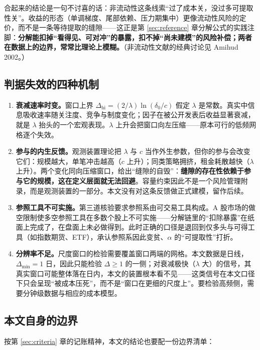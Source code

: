 合起来的结论是一句不讨喜的话：非流动性这条线索“过了成本关，没过多可提取性关”。收益的形态（单调梯度、尾部依赖、压力期集中）更像流动性风险的定价，而不是一条等待提取的缝隙——这正是第 \ref{sec:reference} 章分解公式的实践注脚：\textbf{分解能扣掉“看得见、可对冲”的暴露，扣不掉“尚未建模”的风险补偿；两者在数据上的边界，常常比理论上模糊。}（非流动性文献的经典讨论见 Amihud 2002\cite{amihud2002}。）

\subsection{判据失效的四种机制}

\begin{enumerate}
  \item \textbf{衰减速率时变。}窗口上界 $\Delta_{\mathrm{hi}}=(2/\lambda)\ln(\delta_0/c)$ 假定 $\lambda$ 是常数。真实中信息吸收速率随关注度、竞争与制度变化；因子在被公开发表后收益显著衰减\cite{mcleanpontiff2016}，就是 $\lambda$ 抬头的一个宏观表现。$\lambda$ 上升会把窗口向左压缩——原本可行的低频网格逐个失效。
  \item \textbf{参与的内生反馈。}观测装置理论把 $\lambda$ 与 $c$ 当作外生参数，但你的参与会改变它们：规模越大，单笔冲击越高（$c$ 上升）；同类策略拥挤，租金耗散越快（$\lambda$ 上升）。两个变化同向压缩窗口，给出“缝隙的自毁”：\textbf{缝隙的存在性依赖于参与它的规模，这在定义层面就无法回避}。容量约束因此不是一个风险管理附录，而是观测装置的一部分。本文没有对这条反馈做正式建模，留作后续。
  \item \textbf{参照工具不可实施。}第三道核验要求参照系由可交易工具构成。A 股市场的做空限制使多空参照工具在多数个股上不可实施——分解链里的“扣除暴露”在纸面上完成了，在盘面上未必做得到。此时正确的口径是退回到仅多头与可得工具（如指数期货、ETF），承认参照系因此变贫、$\alpha$ 的“可提取性”打折。
  \item \textbf{分辨率不足。}尺度窗口的检验需要覆盖窗口两端的网格。本文数据是日线，$\Delta_{\min}=1$ 日，因此只能检验 $\Delta\ge1$ 的一侧；对衰减极快（$\lambda$ 大）的信号，其真实窗口可能整体落在日内，本文的装置根本看不见——这类信号在本文口径下只会呈现“被成本压死”，而不是“窗口在更细的尺度上”。要检验高频侧，需要分钟级数据与相应的成本模型。
\end{enumerate}

\subsection{本文自身的边界}\label{sec:selflimit}

按第 \ref{sec:criteria} 章的记账精神，本文的结论也要配一份边界清单：

